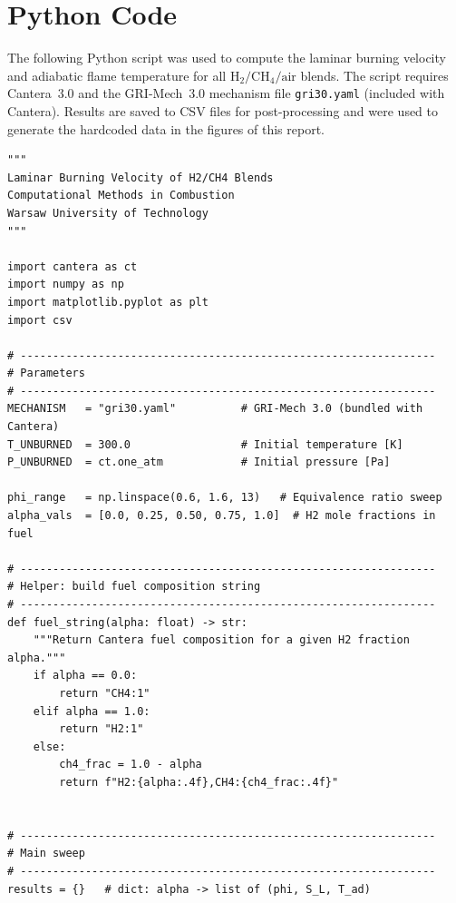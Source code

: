 \documentclass[12pt,a4paper]{article}
\begin{document}
\appendix
\section{Python Code}
\label{app:code}

The following Python script was used to compute the laminar burning velocity and adiabatic flame temperature for all \(\mathrm{H_2}/\mathrm{CH_4}/\mathrm{air}\) blends. The script requires Cantera~3.0 and the GRI-Mech~3.0 mechanism file \texttt{gri30.yaml} (included with Cantera). Results are saved to CSV files for post-processing and were used to generate the hardcoded data in the figures of this report.

\begin{lstlisting}[style=pythonstyle, caption={Python script for laminar burning velocity sweep using Cantera FreeFlame.}, label={lst:code}]
"""
Laminar Burning Velocity of H2/CH4 Blends
Computational Methods in Combustion
Warsaw University of Technology
"""

import cantera as ct
import numpy as np
import matplotlib.pyplot as plt
import csv

# ----------------------------------------------------------------
# Parameters
# ----------------------------------------------------------------
MECHANISM   = "gri30.yaml"          # GRI-Mech 3.0 (bundled with Cantera)
T_UNBURNED  = 300.0                 # Initial temperature [K]
P_UNBURNED  = ct.one_atm            # Initial pressure [Pa]

phi_range   = np.linspace(0.6, 1.6, 13)   # Equivalence ratio sweep
alpha_vals  = [0.0, 0.25, 0.50, 0.75, 1.0]  # H2 mole fractions in fuel

# ----------------------------------------------------------------
# Helper: build fuel composition string
# ----------------------------------------------------------------
def fuel_string(alpha: float) -> str:
    """Return Cantera fuel composition for a given H2 fraction alpha."""
    if alpha == 0.0:
        return "CH4:1"
    elif alpha == 1.0:
        return "H2:1"
    else:
        ch4_frac = 1.0 - alpha
        return f"H2:{alpha:.4f},CH4:{ch4_frac:.4f}"


# ----------------------------------------------------------------
# Main sweep
# ----------------------------------------------------------------
results = {}   # dict: alpha -> list of (phi, S_L, T_ad)


\end{lstlisting}
\end{document}
